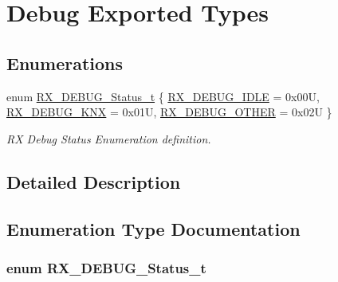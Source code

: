 \hypertarget{group___debug___exported___types}{}\section{Debug Exported Types}
\label{group___debug___exported___types}
\subsection*{Enumerations}
\begin{DoxyCompactItemize}
\item 
enum \hyperlink{group___debug___exported___types_gabcec3ea567663bbefa0b9f7a88dd68f2}{R\+X\+\_\+\+D\+E\+B\+U\+G\+\_\+\+Status\+\_\+t} \{ \hyperlink{group___debug___exported___types_ggabcec3ea567663bbefa0b9f7a88dd68f2a9be7a7b6137e4337233fdc0a02e4d20c}{R\+X\+\_\+\+D\+E\+B\+U\+G\+\_\+\+I\+D\+LE} = 0x00U, 
\hyperlink{group___debug___exported___types_ggabcec3ea567663bbefa0b9f7a88dd68f2a601e7df15abbf2a8de94418b74ea57fb}{R\+X\+\_\+\+D\+E\+B\+U\+G\+\_\+\+K\+NX} = 0x01U, 
\hyperlink{group___debug___exported___types_ggabcec3ea567663bbefa0b9f7a88dd68f2ad6618747bfa92556e5fc0f50df497771}{R\+X\+\_\+\+D\+E\+B\+U\+G\+\_\+\+O\+T\+H\+ER} = 0x02U
 \}\begin{DoxyCompactList}\small\item\em RX Debug Status Enumeration definition. \end{DoxyCompactList}
\end{DoxyCompactItemize}


\subsection{Detailed Description}


\subsection{Enumeration Type Documentation}
\subsubsection[{\texorpdfstring{R\+X\+\_\+\+D\+E\+B\+U\+G\+\_\+\+Status\+\_\+t}{RX_DEBUG_Status_t}}]{\setlength{\rightskip}{0pt plus 5cm}enum {\bf R\+X\+\_\+\+D\+E\+B\+U\+G\+\_\+\+Status\+\_\+t}}\hypertarget{group___debug___exported___types_gabcec3ea567663bbefa0b9f7a88dd68f2}{}\label{group___debug___exported___types_gabcec3ea567663bbefa0b9f7a88dd68f2}


